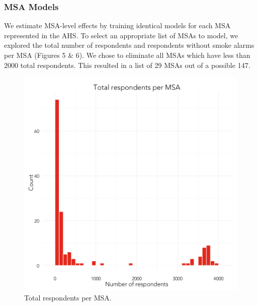 \documentclass{sig-alternate}
\begin{document}
\subsubsection{MSA Models}
We estimate MSA-level effects by training identical models for each MSA represented in the AHS. To select an appropriate list of MSAs to model, we explored the total number of respondents and respondents without smoke alarms per MSA (Figures 5 \& 6). We chose to eliminate  all MSAs which have less than 2000 total respondents.  This resulted in a list of 29 MSAs out of a possible 147.

\begin{figure}
\centering 
\includegraphics[scale=0.42]{compute-msa-stats-histogram-1.png}
\caption{Total respondents per MSA.}
\end{figure}
\end{document}
